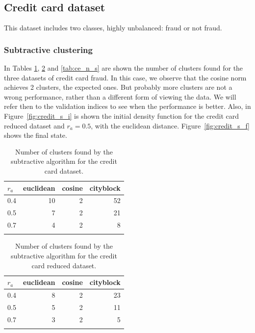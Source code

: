 \subsection{Credit card dataset}
This dataset includes two classes, highly unbalanced: fraud or not fraud.
\subsubsection{Subtractive clustering}
    In Tables \ref{tab:c1_n_s}, \ref{tab:c2_n_s} and \ref{tab:ce_n_s} are shown the number of clusters found for the three datasets of credit card fraud. In this case, we observe that the cosine norm achieves 2 clusters, the expected ones. But probably more clusters are not a wrong performance, rather than a different form of viewing the data. We will refer then to the validation indices to see when the performance is better. Also, in Figure~\ref{fig:credit_s_i} is shown the initial density function for the credit card reduced dataset and $r_a = 0.5$, with the euclidean distance. Figure~\ref{fig:credit_s_f} shows the final state.
    \begin{table}[ht!]
        \centering
        \begin{tabular}{lrrr}
        \toprule
        $r_a$ &  euclidean &  cosine &  cityblock \\
        \midrule
        0.4 &         10 &       2 &         52 \\
        0.5 &          7 &       2 &         21 \\
        0.7 &          4 &       2 &          8 \\
        \bottomrule \\
        \end{tabular}
        \caption{Number of clusters found by the subtractive algorithm for the credit card dataset.}
        \label{tab:c1_n_s}
    \end{table}
    
    \begin{table}[ht!]
        \centering
        \begin{tabular}{lrrr}
        \toprule
        $r_a$ &  euclidean &  cosine &  cityblock \\
        \midrule
        0.4 &          8 &       2 &         23 \\
        0.5 &          5 &       2 &         11 \\
        0.7 &          3 &       2 &          5 \\
        \bottomrule \\
        \end{tabular}
        \caption{Number of clusters found by the subtractive algorithm for the credit card reduced dataset.}
        \label{tab:c2_n_s}
    \end{table}
    
